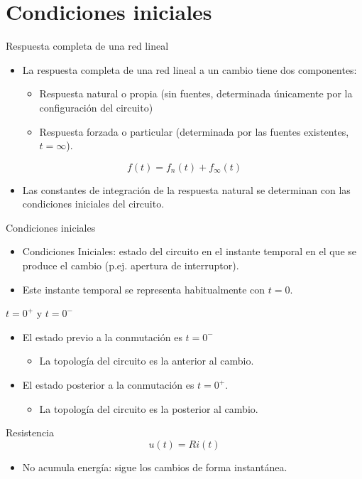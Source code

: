 \documentclass[xcolor={usenames,svgnames,dvipsnames}]{beamer}
\begin{document}
\section{Condiciones iniciales}
\label{sec:org099a045}
\begin{frame}[label={sec:orgf6de9cd}]{Respuesta completa de una red lineal}
\begin{itemize}
\item La respuesta completa de una red lineal a un cambio tiene dos componentes:
\begin{itemize}
\item Respuesta \alert{natural} o propia (sin fuentes, determinada únicamente por la configuración del circuito)
\item Respuesta \alert{forzada} o particular (determinada por las fuentes existentes, \(t = \infty\)).
\end{itemize}
\end{itemize}
\[
 f(t) = f_n(t) + f_\infty(t) 
 \]
\begin{itemize}
\item Las constantes de integración de la respuesta natural se determinan con las condiciones iniciales del circuito.
\end{itemize}
\end{frame}

\begin{frame}[label={sec:org1019cbe}]{Condiciones iniciales}
\begin{itemize}
\item \alert{Condiciones Iniciales}: estado del circuito en el instante temporal en el que se produce el cambio (p.ej. apertura de interruptor).
\item Este instante temporal se representa habitualmente con \(t = 0\).
\end{itemize}
\end{frame}
\begin{frame}[label={sec:orgfcee067}]{\(t = 0^+\) y \(t = 0^-\)}
\begin{itemize}
\item El estado previo a la conmutación es \(t = 0^-\) 
\begin{itemize}
\item La topología del circuito es la anterior al cambio.
\end{itemize}
\item El estado posterior a la conmutación es \(t = 0^+\).
\begin{itemize}
\item La topología del circuito es la posterior al cambio.
\end{itemize}
\end{itemize}
\end{frame}
\begin{frame}[label={sec:org9438a2c}]{Resistencia}
\[
u(t) = R i(t)
\]

\begin{itemize}
\item No acumula energía: sigue los cambios de forma instantánea.
\end{itemize}
\end{frame}
\end{document}
